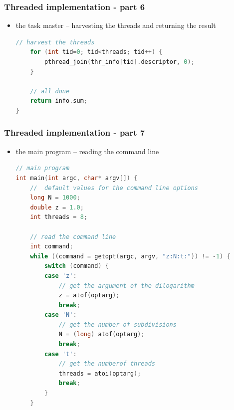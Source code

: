 \begin{frame}[fragile]
%
  \frametitle{Threaded implementation - part 6}
%
  \begin{itemize}
  \item the task master -- harvesting the threads and returning the result
  \begin{lstlisting}[language=c++,name=threaded]
    // harvest the threads
    for (int tid=0; tid<threads; tid++) {
        pthread_join(thr_info[tid].descriptor, 0);
    }

    // all done
    return info.sum;
}
  \end{lstlisting}
%
  \end{itemize}
%
\end{frame}

\begin{frame}[fragile]
%
  \frametitle{Threaded implementation - part 7}
%
  \begin{itemize}
  \item the main program -- reading the command line
  \begin{lstlisting}[language=c++,name=threaded]
// main program
int main(int argc, char* argv[]) {
    //  default values for the command line options
    long N = 1000;
    double z = 1.0;
    int threads = 8;

    // read the command line
    int command;
    while ((command = getopt(argc, argv, "z:N:t:")) != -1) {
        switch (command) {
        case 'z':
            // get the argument of the dilogarithm 
            z = atof(optarg);
            break;
        case 'N':
            // get the number of subdivisions
            N = (long) atof(optarg);
            break;
        case 't':
            // get the numberof threads
            threads = atoi(optarg);
            break;
        }
    }

  \end{lstlisting}
%
  \end{itemize}
%
\end{frame}

